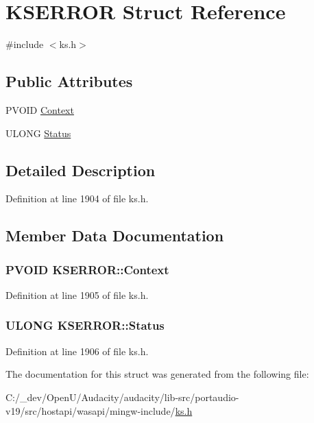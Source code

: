 \hypertarget{struct_k_s_e_r_r_o_r}{}\section{K\+S\+E\+R\+R\+OR Struct Reference}
\label{struct_k_s_e_r_r_o_r}


{\ttfamily \#include $<$ks.\+h$>$}

\subsection*{Public Attributes}
\begin{DoxyCompactItemize}
\item 
P\+V\+O\+ID \hyperlink{struct_k_s_e_r_r_o_r_a802844a8d1ebb6cc20e209863befcc3e}{Context}
\item 
U\+L\+O\+NG \hyperlink{struct_k_s_e_r_r_o_r_a476520f0a02ef6d4a4b8585c4e215b37}{Status}
\end{DoxyCompactItemize}


\subsection{Detailed Description}


Definition at line 1904 of file ks.\+h.



\subsection{Member Data Documentation}
\subsubsection[{\texorpdfstring{Context}{Context}}]{\setlength{\rightskip}{0pt plus 5cm}P\+V\+O\+ID K\+S\+E\+R\+R\+O\+R\+::\+Context}\hypertarget{struct_k_s_e_r_r_o_r_a802844a8d1ebb6cc20e209863befcc3e}{}\label{struct_k_s_e_r_r_o_r_a802844a8d1ebb6cc20e209863befcc3e}


Definition at line 1905 of file ks.\+h.

\subsubsection[{\texorpdfstring{Status}{Status}}]{\setlength{\rightskip}{0pt plus 5cm}U\+L\+O\+NG K\+S\+E\+R\+R\+O\+R\+::\+Status}\hypertarget{struct_k_s_e_r_r_o_r_a476520f0a02ef6d4a4b8585c4e215b37}{}\label{struct_k_s_e_r_r_o_r_a476520f0a02ef6d4a4b8585c4e215b37}


Definition at line 1906 of file ks.\+h.



The documentation for this struct was generated from the following file\+:\begin{DoxyCompactItemize}
\item 
C\+:/\+\_\+dev/\+Open\+U/\+Audacity/audacity/lib-\/src/portaudio-\/v19/src/hostapi/wasapi/mingw-\/include/\hyperlink{ks_8h}{ks.\+h}\end{DoxyCompactItemize}

